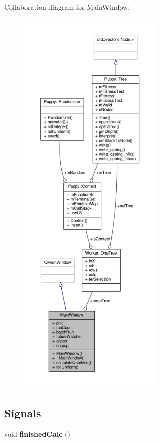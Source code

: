 Collaboration diagram for Main\+Window\+:
\nopagebreak
\begin{figure}[H]
\begin{center}
\leavevmode
\includegraphics[height=550pt]{classMainWindow__coll__graph}
\end{center}
\end{figure}
\subsection*{Signals}
\begin{DoxyCompactItemize}
\item 
\hypertarget{classMainWindow_a96209ee66905f9c12819a54ec55e9355}{}void {\bfseries finished\+Calc} ()\label{classMainWindow_a96209ee66905f9c12819a54ec55e9355}

\end{DoxyCompactItemize}
